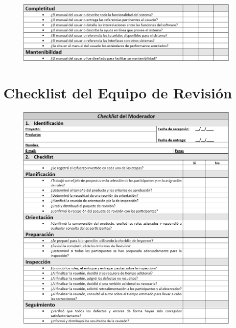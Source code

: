 \begin{figure}[H]
\centering
\includegraphics[width=1\textwidth]{figures/anexos/3-2-7b.PNG}
\end{figure}

\section{Checklist del Equipo de Revisión}

\begin{figure}[H]
\centering
\includegraphics[width=1\textwidth]{figures/anexos/4-1.PNG}
\end{figure}

